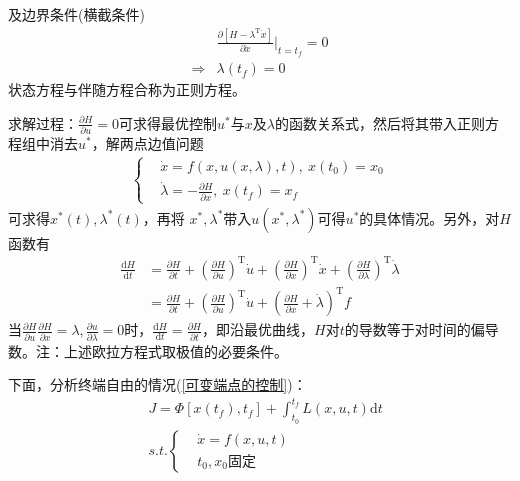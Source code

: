             及边界条件(横截条件)
            \begin{align*}
            & \frac{\partial [H-\lambda^\mathrm{T}\dot{x}]}{\partial \dot{x}}\Big|_{t=t_f} = 0\\
            \Rightarrow {} & \lambda(t_f) = 0
            \end{align*}
            状态方程与伴随方程合称为正则方程。
            \par
            求解过程：$\frac{\partial H}{\partial u} = 0$可求得最优控制$u^*$与$x$及$\lambda$的函数关系式，然后将其带入正则方程组中消去$u^*$，解两点边值问题
            \begin{align*}
            \left\{
            \begin{aligned}
            & \dot{x} = f(x,u(x,\lambda),t),\ x(t_0) =x_0\\
            & \dot{\lambda} = -\frac{\partial H}{\partial x}, \ x(t_f) = x_f
            \end{aligned}
            \right.
            \end{align*}
            可求得$x^*(t),\lambda^*(t)$，再将 $x^*,\lambda^*$带入$u(x^*,\lambda^*)$可得$u^*$的具体情况。另外，对$H$函数有
            \begin{align*}
            \frac{\mathrm{d}H}{\mathrm{d}t} & = \frac{\partial H}{\partial t} + \left( \frac{\partial H}{\partial u} \right)^{\mathrm{T}}\dot{u} + \left( \frac{\partial H}{\partial x} \right)^\mathrm{T}\dot{x} + \left( \frac{\partial H}{\partial \lambda} \right)^\mathrm{T}\dot{\lambda}\\
            & =\frac{\partial H}{\partial t}+ \left( \frac{\partial H}{\partial u} \right) ^\mathrm{T}\dot{u}+\left( \frac{\partial H}{\partial x}+\dot{\lambda} \right) ^\mathrm{T}f
            \end{align*}
            当$\frac{\partial H}{\partial u}\frac{\partial H}{\partial x} = \lambda,\frac{\partial u}{\partial \lambda} = 0$时，$\frac{\mathrm{d}H}{\mathrm{d}t} = \frac{\partial H}{\partial t}$，即沿最优曲线，$H$对$t$的导数等于对时间的偏导数。注：上述欧拉方程式取极值的必要条件。
            \par
            下面，分析终端自由的情况(\ref{可变端点的控制})：
            \begin{align*}
            &J = \Phi[x(t_f),t_f]+\int_{t_0}^{t_f}L(x,u,t)\mathrm{d}t\\
            &s.t.\left\{
            \begin{aligned}
            &\dot{x} = f(x,u,t)\\
            &t_0,x_0\text{固定}
            \end{aligned}
            \right.
            \end{align*}
